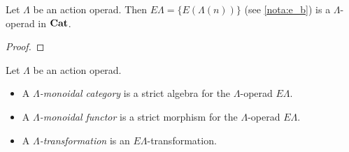 %

\begin{cor}\label{cor:elambda_lambdaop}
Let $\Lambda$ be an action operad. Then $E\Lambda = \{ E\left(\Lambda(n)\right) \}$ (see \cref{nota:e_b}) is a $\Lambda$-operad in $\mathbf{Cat}$.
\end{cor}
\begin{proof}
\end{proof}



\begin{Defi}\label{Defi:lmc}
Let $\Lambda$ be an action operad.
\begin{itemize}
\item A \emph{$\Lambda$-monoidal category} is a strict algebra for the $\Lambda$-operad $E\Lambda$. 
\item A \emph{$\Lambda$-monoidal functor} is a strict morphism for the $\Lambda$-operad $E\Lambda$. 
\item A \emph{$\Lambda$-transformation} is an $E\Lambda$-transformation.
\end{itemize}
\end{Defi}

